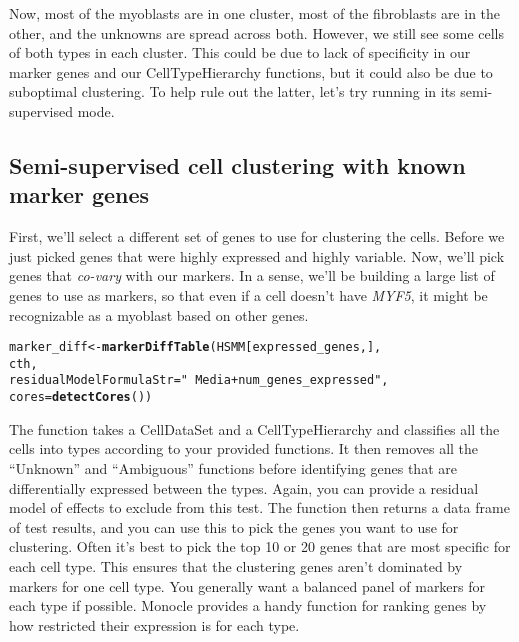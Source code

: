 \documentclass[10pt,oneside]{article}\usepackage[]{graphicx}\usepackage[]{color}
\makeatletter
\newcommand{\hlstr}[1]{\textcolor[rgb]{0.192,0.494,0.8}{#1}}%
\newcommand{\hlstd}[1]{\textcolor[rgb]{0.345,0.345,0.345}{#1}}%
\newcommand{\hlkwb}[1]{\textcolor[rgb]{0.69,0.353,0.396}{#1}}%
\newcommand{\hlkwc}[1]{\textcolor[rgb]{0.333,0.667,0.333}{#1}}%
\newcommand{\hlkwd}[1]{\textcolor[rgb]{0.737,0.353,0.396}{\textbf{#1}}}%
\newenvironment{kframe}{%
 \def\at@end@of@kframe{}%
 \ifinner\ifhmode%
  \def\at@end@of@kframe{\end{minipage}}%
  \begin{minipage}{\columnwidth}%
 \fi\fi%
 \def\FrameCommand##1{\hskip\@totalleftmargin \hskip-\fboxsep
 \colorbox{shadecolor}{##1}\hskip-\fboxsep
     \hskip-\linewidth \hskip-\@totalleftmargin \hskip\columnwidth}%
 \MakeFramed {\advance\hsize-\width
   \@totalleftmargin\z@ \linewidth\hsize
   \@setminipage}}%
 {\par\unskip\endMakeFramed%
 \at@end@of@kframe}
\newenvironment{knitrout}{}{} %
\makeatother
\begin{document}
Now, most of the myoblasts are in one cluster, most of the fibroblasts are in the other, and the unknowns are spread across both. However, we still see some cells of both types in each cluster. This could be due to lack of specificity in our marker genes and our CellTypeHierarchy functions, but it could also be due to suboptimal clustering. To help rule out the latter, let's try running  in its semi-supervised mode.  
  
\subsection{Semi-supervised cell clustering with known marker genes}
  
First, we'll select a different set of genes to use for clustering the cells. Before we just picked genes that were highly expressed and highly variable. Now, we'll pick genes that \emph{co-vary} with our markers. In a sense, we'll be building a large list of genes to use as markers, so that even if a cell doesn't have \emph{MYF5}, it might be recognizable as a myoblast based on other genes.
  
\begin{knitrout}
\color{fgcolor}\begin{kframe}
\begin{alltt}
\hlstd{marker_diff} \hlkwb{<-} \hlkwd{markerDiffTable}\hlstd{(HSMM[expressed_genes,],}
                                 \hlstd{cth,}
                                 \hlkwc{residualModelFormulaStr}\hlstd{=}\hlstr{"~Media + num_genes_expressed"}\hlstd{,}
                                 \hlkwc{cores}\hlstd{=}\hlkwd{detectCores}\hlstd{())}
\end{alltt}
\end{kframe}
\end{knitrout}



The function  takes a CellDataSet and a CellTypeHierarchy and classifies all the cells into types according to your provided functions. It then removes all the ``Unknown'' and ``Ambiguous'' functions before identifying genes that are differentially expressed between the types. Again, you can provide a residual model of effects to exclude from this test. The function then returns a data frame of test results, and you can use this to pick the genes you want to use for clustering. Often it's best to pick the top 10 or 20 genes that are most specific for each cell type. This ensures that the clustering genes aren't dominated by markers for one cell type. You generally want a balanced panel of markers for each type if possible. Monocle provides a handy function for ranking genes by how restricted their expression is for each type.  
\end{document}
